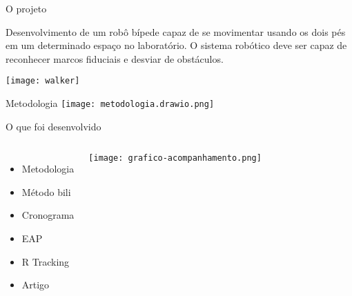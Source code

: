 \begin{frame}[t]{O projeto}
    
    Desenvolvimento de um robô bípede capaz de se movimentar usando os dois pés em um determinado 
    espaço no laboratório. O sistema robótico deve ser capaz de reconhecer marcos fiduciais e desviar de obstáculos. 
        \begin{center}
            \texttt{[image: walker]}
        \end{center}
\end{frame}

\begin{frame}[t]{Metodologia} 
    \centering
    \texttt{[image: metodologia.drawio.png]}

\end{frame}

\begin{frame}[t]{O que foi desenvolvido} 
        \begin{columns}[c]
                \newline
                \begin{itemize}
                    \item Metodologia
                    \item Método bili
                    \item Cronograma
                    \item EAP
                    \item R Tracking
                    \item Artigo
                \end{itemize}
            \begin{columns}[c]
                \texttt{[image: grafico-acompanhamento.png]}
            \end{columns}
        \end{columns}

\end{frame}

